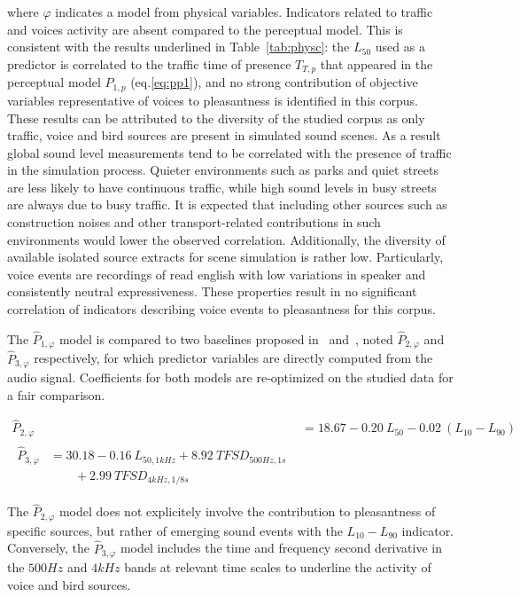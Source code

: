 \documentclass[twocolumn]{article}
\begin{document}
where $\varphi$ indicates a model from physical variables. Indicators related to traffic and voices activity are absent compared to the perceptual model. This is consistent with the results underlined in Table~\ref{tab:physc}: the $L_{50}$ used as a predictor is correlated to the traffic time of presence $T_{T, p}$ that appeared in the perceptual model $\hat P_{1, p}$ (eq.\ref{eq:pp1}), and no strong contribution of objective variables representative of voices to pleasantness is identified in this corpus. These results can be attributed to the diversity of the studied corpus as only traffic, voice and bird sources are present in simulated sound scenes. As a result global sound level measurements tend to be correlated with the presence of traffic in the simulation process. Quieter environments such as parks and quiet streets are less likely to have continuous traffic, while high sound levels in busy streets are always due to busy traffic. It is expected that including other sources such as construction noises and other transport-related contributions in such environments would lower the observed correlation. Additionally, the diversity of available isolated source extracts for scene simulation is rather low. Particularly, voice events are recordings of read english with low variations in speaker and consistently neutral expressiveness. These properties result in no significant correlation of indicators describing voice events to pleasantness for this corpus.

The $\hat P_{1, \varphi}$ model is compared to two baselines proposed in~\cite{ricciardi2014} and~\cite{aumond2017}, noted $\hat P_{2, \varphi}$ and $\hat P_{3, \varphi}$ respectively, for which predictor variables are directly computed from the audio signal. Coefficients for both models are re-optimized on the studied data for a fair comparison. 

\begin{align}
\hat P_{2, \varphi} &= 18.67 - 0.20~L_{50} - 0.02~(L_{10}-L_{90})\\
\begin{split}
\hat P_{3, \varphi} &= 30.18 - 0.16~L_{50, 1kHz} + 8.92~TFSD_{500Hz, 1s} \\
&\qquad + 2.99~TFSD_{4kHz, 1/8s}
\end{split}
\end{align}

The $\hat P_{2, \varphi}$ model does not explicitely involve the contribution to pleasantness of specific sources, but rather of emerging sound events with the $L_{10}-L_{90}$ indicator. Conversely, the $\hat P_{3, \varphi}$ model includes the time and frequency second derivative in the $500Hz$ and $4kHz$ bands at relevant time scales to underline the activity of voice and bird sources.
\end{document}
